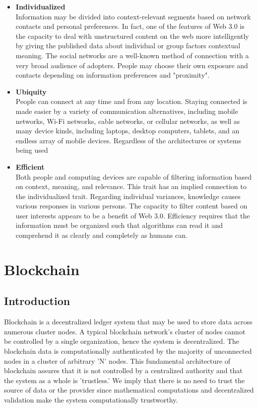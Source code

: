 \begin{itemize}

    \item \textbf{Individualized} \\
    Information may be divided into context-relevant segments based on network contacts and personal preferences. In fact, one of the features of Web 3.0 is the capacity to deal with unstructured content on the web more intelligently by giving the published data about individual or group factors contextual meaning. The social networks are a well-known method of connection with a very broad audience of adopters. People may choose their own exposure and contacts depending on information preferences and "proximity".

\vspace{.5cm}

    \item \textbf{Ubiquity} \\
  People can connect at any time and from any location. Staying connected is made easier by a variety of communication alternatives, including mobile networks, Wi-Fi networks, cable networks, or cellular networks, as well as many device kinds, including laptops, desktop computers, tablets, and an endless array of mobile devices. Regardless of the architectures or systems being used


\vspace{.5cm}


    \item \textbf{Efficient} \\
    Both people and computing devices are capable of filtering information based on context, meaning, and relevance. This trait has an implied connection to the individualized trait. Regarding individual variances, knowledge causes various responses in various persons. The capacity to filter content based on user interests appears to be a benefit of Web 3.0. Efficiency requires that the information must be organized such that algorithms can read it and comprehend it as clearly and completely as humans can.

\end{itemize}
\section{Blockchain}

\subsection{Introduction}
Blockchain is a decentralized ledger system that may be used to store data across numerous cluster nodes. A typical blockchain network's cluster of nodes cannot be controlled by a single organization, hence the system is decentralized. The blockchain data is computationally authenticated by the majority of unconnected nodes in a cluster of arbitrary 'N' nodes. This fundamental architecture of blockchain assures that it is not controlled by a centralized authority and that the system as a whole is 'trustless.' We imply that there is no need to trust the source of data or the provider since mathematical computations and decentralized validation make the system computationally trustworthy.

